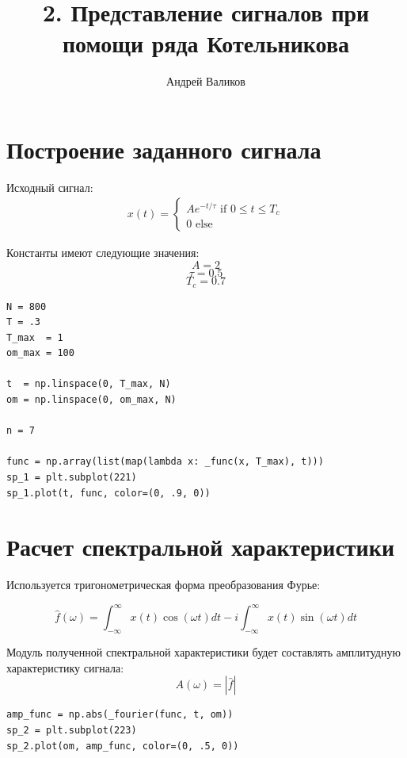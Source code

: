 \documentclass[12pt]{article}
\begin{document}
\title{2. Представление сигналов при помощи ряда Котельникова}
\author{Андрей Валиков}
\date{}
\maketitle
																																																								\section{Построение заданного сигнала}
Исходный сигнал:
\begin{gather*}
x(t) = 
\begin{cases}
  Ae^{-t/\tau} \text{ if $0\leq t\leq T_c$}\\
  0 \text{ else}    
\end{cases}
\end{gather*}

\noindent Константы имеют следующие значения:
\[A = 2\]
\[\tau = 0.5\]
\[T_c = 0.7\]

\begin{lstlisting}
N = 800
T = .3
T_max  = 1
om_max = 100

t  = np.linspace(0, T_max, N)
om = np.linspace(0, om_max, N)

n = 7

func = np.array(list(map(lambda x: _func(x, T_max), t)))
sp_1 = plt.subplot(221)
sp_1.plot(t, func, color=(0, .9, 0))
\end{lstlisting}



\section{ Расчет спектральной характеристики}
Используется тригонометрическая форма преобразования Фурье:

\[\hat{f}(\omega) = \int_{-\infty}^{\infty}x(t)\cos(\omega t)dt -
 i\int_{-\infty}^{\infty}x(t)\sin(\omega t)dt\]
 
\noindent Модуль полученной спектральной характеристики будет составлять амплитудную характеристику сигнала:
\[A(\omega) = |\hat{f}|\]


\begin{lstlisting}
amp_func = np.abs(_fourier(func, t, om))
sp_2 = plt.subplot(223)
sp_2.plot(om, amp_func, color=(0, .5, 0))
\end{lstlisting}

\begin{figure}[!htb]
\centering
\caption{}
\label{}
\end{figure}
\end{document}
